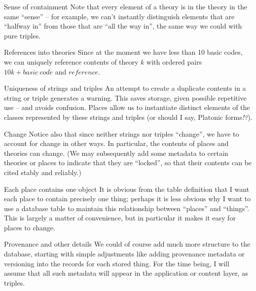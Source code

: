 \begin{notate}{Sense of containment}
Note that every element of a theory is in the theory in
the same ``sense'' -- for example, we can't instantly
distinguish elements that are ``halfway in'' from those
that are ``all the way in'', the same way we could with
pure triples.
\end{notate}

\begin{notate}{References into theories}
Since at the moment we have less than 10 basic codes, we
can uniquely reference contents of theory $k$ with ordered
pairs $10k+\mathit{basic\ code}$ and $\mathit{reference}$.
\end{notate}

\begin{notate}{Uniqueness of strings and triples} \label{unique-things}
An attempt to create a duplicate contents in a string or
triple generates a warning.  This saves storage, given
possible repetitive use -- and avoids confusion.  Places
allow us to instantiate distinct elements of the classes
represented by these strings and triples (or should I say,
Platonic forms\emph{!?}).
\end{notate}

\begin{notate}{Change} \label{change}
Notice also that since neither strings nor triples
``change'', we have to account for change in other ways.
In particular, the contents of places and theories can
change.  (We may subsequently add some metadata to certain
theories or places to indicate that they are ``locked'',
so that their contents can be cited stably and reliably.)
\end{notate}

\begin{notate}{Each place contains one object} \label{places}
It is obvious from the table definition that I want each
place to contain precisely one thing; perhaps it is less
obvious why I want to use a database table to maintain
this relationship between ``places'' and ``things''.  This
is largely a matter of convenience, but in particular it
makes it easy for places to change.
\end{notate}

\begin{notate}{Provenance and other details} \label{provenance}
We could of course add much more structure to the
database, starting with simple adjustments like adding
provenance metadata or versioning into the records for
each stored thing.  For the time being, I will assume that
all such metadata will appear in the application or
content layer, as triples.
\end{notate}

